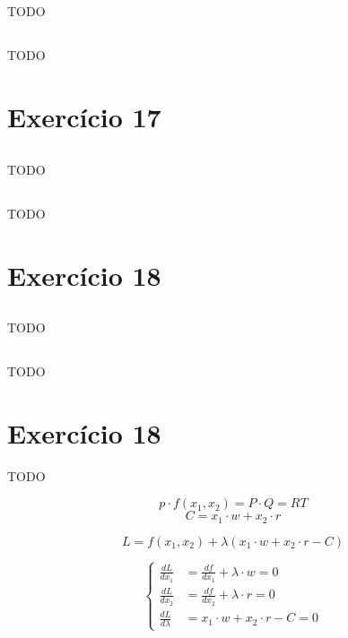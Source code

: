 \documentclass{article}
\begin{document}
\subsection{}
TODO
\subsection{}
TODO

\section{Exercício 17}
\subsection{}
TODO
\subsection{}
TODO

\section{Exercício 18}
\subsection{}
TODO
\subsection{}
TODO

\section{Exercício 18}
TODO




\[
	p \cdot f(x_1, x_2) = P \cdot Q = RT
\]
\[
	C = x_1 \cdot w + x_2 \cdot r
\]

\[
	L = f(x_1, x_2) + \lambda(x_1 \cdot w + x_2 \cdot r - C)
\]

\[
	\left\{
	\begin{aligned}
		\frac{dL}{dx_1}     & = \frac{df}{dx_1} + \lambda \cdot w = 0 \\
		\frac{dL}{dx_2}     & = \frac{df}{dx_2} + \lambda \cdot r = 0 \\
		\frac{dL}{d\lambda} & = x_1 \cdot w + x_2 \cdot r - C  = 0
	\end{aligned}
	\right.
\]
\end{document}
